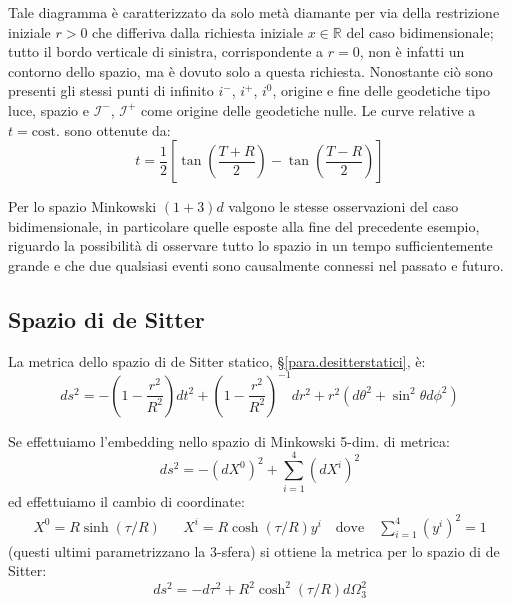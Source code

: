 Tale diagramma è caratterizzato da solo metà diamante per via della restrizione iniziale $r>0$ che differiva dalla richiesta iniziale $x\in\mathbb{R}$ del caso bidimensionale; tutto il bordo verticale di sinistra, corrispondente a $r=0$, non è infatti un contorno dello spazio, ma è dovuto solo a questa richiesta. Nonostante ciò sono presenti gli stessi punti di infinito $i^-$, $i^+$, $i^0$, origine e fine delle geodetiche tipo luce, spazio e $\mathcal{I}^-$, $\mathcal{I}^+$ come origine delle geodetiche nulle. Le curve relative a $t= \textrm{cost.}$ sono ottenute da:
\begin{equation*}
    t= \frac{1}{2}\left[  \tan\left( \frac{T + R}{2}\right)  -  \tan\left( \frac{T - R}{2}\right)\right]
\end{equation*}

Per lo spazio Minkowski $(1+3)d$ valgono le stesse osservazioni del caso bidimensionale, in particolare quelle esposte alla fine del precedente esempio, riguardo la possibilità di osservare tutto lo spazio in un tempo sufficientemente grande e che due qualsiasi eventi sono causalmente connessi nel passato e futuro.

\subsection{Spazio di de Sitter}
La metrica dello spazio di de Sitter statico, \S\ref{para.desitterstatici}, è:
\begin{equation*}
    ds^2 = - \left( 1 - \frac{r^2}{R^2} \right)dt^2 + \left( 1 - \frac{r^2}{R^2} \right)^{-1}dr^2 + r^2(d\theta^2 + \sin^2\theta d\phi^2)
\end{equation*}

Se effettuiamo l'embedding nello spazio di Minkowski 5-dim. di metrica:
\begin{equation*}
    ds^2 = -(dX^0)^2 + \sum_{i=1}^4 (dX^i)^2
\end{equation*}
ed effettuiamo il cambio di coordinate:
\begin{align*}
    X^0=R\sinh(\tau/R) && X^i = R\cosh(\tau/R)y^i \quad \textrm{dove} \quad \sum_{i=1}^4 (y^i)^2 = 1
\end{align*}
(questi ultimi parametrizzano la 3-sfera) si ottiene la metrica per lo spazio di de Sitter:
\begin{equation*}
    ds^2 = -d\tau^2 + R^2\cosh^2(\tau/R)d\Omega_3^2
\end{equation*}

